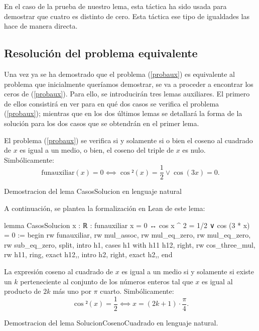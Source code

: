 En el caso de la prueba de nuestro lema, esta táctica ha sido
usada para demostrar que cuatro es distinto de cero. Esta táctica
ese tipo de igualdades las hace de manera directa.

\subsection{Resolución del problema equivalente}
Una vez ya se ha demostrado que el problema (\ref{probaux}) es
equivalente al problema que inicialmente queríamos demostrar, se
va a proceder a encontrar los ceros de (\ref{probaux}). Para
ello, se introducirán tres lemas auxiliares. El primero de ellos
consistirá en ver para en qué dos casos se verifica el problema
(\ref{probaux}); mientras que en los dos últimos lemas se detallará
la forma de la solución para los dos casos que se obtendrán en el
primer lema.

\begin{lema}[CasosSolucion]El problema (\ref{probaux}) se verifica
  si y solamente si o bien el coseno al cuadrado de \(x\) es igual
  a un medio, o bien, el coseno del triple de \(x\) es nulo.
  Simbólicamente:
  \begin{equation}
    \text{funauxiliar}(x)=0 ⟺ \cos²(x)=\frac{1}{2} \lor \cos(3x)=0.
  \end{equation}
  \end{lema}
\begin{demostracion}
  Demostracion del lema CasosSolucion en lenguaje natural
\end{demostracion}

A continuación, se plantea la formalización en Lean de este lema:
\begin{leancode}
lemma CasosSolucion {x : ℝ} :
funauxiliar x = 0 ↔ cos x ^ 2 = 1/2 ∨ cos (3 * x) = 0 :=
begin
  rw funauxiliar,
  rw mul_assoc,
  rw mul_eq_zero,
  rw mul_eq_zero,
  rw sub_eq_zero,
  split,
  {intro h1,
  cases h1 with h11 h12,
  right,
  rw cos_three_mul,
  rw h11,
  ring,
  exact h12,},
  {intro h2,
  right,
  exact h2,},
end
\end{leancode}

\begin{lema}[SolucionCosenoCuadrado]La expresión coseno al
  cuadrado de \(x\) es igual a un medio si y solamente si
  existe un \(k\) perteneciente al conjunto de los números
  enteros tal que \(x\) es igual al producto de \(2k\) más
  uno por \(π\) cuarto. Simbólicamente:
  \begin{equation}
    \cos²(x)=\frac{1}{2} ⟺ x=(2k+1)⋅\frac{π}{4}.
  \end{equation}
\end{lema}
\begin{demostracion}
  Demostracion del lema SolucionCosenoCuadrado en lenguaje
  natural.
\end{demostracion}


